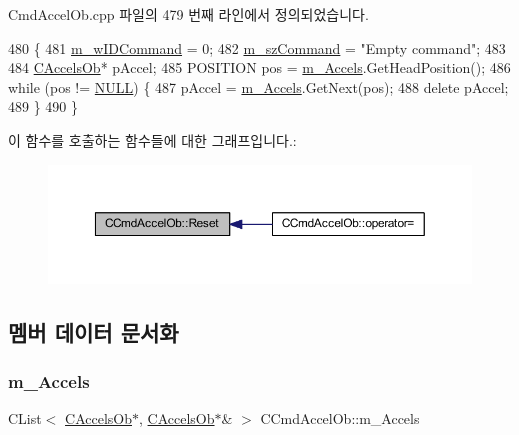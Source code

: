 Cmd\+Accel\+Ob.\+cpp 파일의 479 번째 라인에서 정의되었습니다.


\begin{DoxyCode}
480 \{
481   \mbox{\hyperlink{class_c_cmd_accel_ob_aa3eb02dcd39ff14763fdefd8fabd7591}{m\_wIDCommand}} = 0;
482   \mbox{\hyperlink{class_c_cmd_accel_ob_acbd02cc68d3909b1e39b687e76f45d91}{m\_szCommand}} = \textcolor{stringliteral}{"Empty command"};
483   
484   \mbox{\hyperlink{class_c_accels_ob}{CAccelsOb}}* pAccel;
485   POSITION pos = \mbox{\hyperlink{class_c_cmd_accel_ob_a85772f1ea9204af42b8a39a0135dc0f8}{m\_Accels}}.GetHeadPosition();
486   \textcolor{keywordflow}{while} (pos != \mbox{\hyperlink{getopt1_8c_a070d2ce7b6bb7e5c05602aa8c308d0c4}{NULL}}) \{
487     pAccel = \mbox{\hyperlink{class_c_cmd_accel_ob_a85772f1ea9204af42b8a39a0135dc0f8}{m\_Accels}}.GetNext(pos);
488     \textcolor{keyword}{delete} pAccel;
489   \}
490 \}
\end{DoxyCode}
이 함수를 호출하는 함수들에 대한 그래프입니다.\+:
\nopagebreak
\begin{figure}[H]
\begin{center}
\leavevmode
\includegraphics[width=350pt]{class_c_cmd_accel_ob_ac679e57ed400b175109af50ea2ce919d_icgraph}
\end{center}
\end{figure}


\subsection{멤버 데이터 문서화}
\mbox{\label{class_c_cmd_accel_ob_a85772f1ea9204af42b8a39a0135dc0f8}} 
\subsubsection{\texorpdfstring{m\+\_\+\+Accels}{m\_Accels}}
{\footnotesize\ttfamily C\+List$<$ \mbox{\hyperlink{class_c_accels_ob}{C\+Accels\+Ob}}$\ast$, \mbox{\hyperlink{class_c_accels_ob}{C\+Accels\+Ob}}$\ast$\& $>$ C\+Cmd\+Accel\+Ob\+::m\+\_\+\+Accels}



